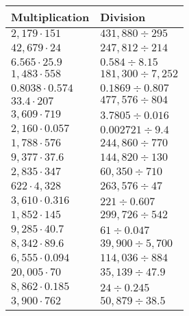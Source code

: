 \begin{longtable}[]{@{}ll@{}}
\toprule
Multiplication & Division\tabularnewline
\midrule
\endhead
\(2,179\cdot151\) & \(431,880÷295\)\tabularnewline
\(42,679\cdot24\) & \(247,812÷214\)\tabularnewline
\(6.565\cdot25.9\) & \(0.584÷8.15\)\tabularnewline
\(1,483\cdot558\) & \(181,300÷7,252\)\tabularnewline
\(0.8038\cdot0.574\) & \(0.1869÷0.807\)\tabularnewline
\(33.4\cdot207\) & \(477,576÷804\)\tabularnewline
\(3,609\cdot719\) & \(3.7805÷0.016\)\tabularnewline
\(2,160\cdot0.057\) & \(0.002721÷9.4\)\tabularnewline
\(1,788\cdot576\) & \(244,860÷770\)\tabularnewline
\(9,377\cdot37.6\) & \(144,820÷130\)\tabularnewline
\(2,835\cdot347\) & \(60,350÷710\)\tabularnewline
\(622\cdot4,328\) & \(263,576÷47\)\tabularnewline
\(3,610\cdot0.316\) & \(221÷0.607\)\tabularnewline
\(1,852\cdot145\) & \(299,726÷542\)\tabularnewline
\(9,285\cdot40.7\) & \(61÷0.047\)\tabularnewline
\(8,342\cdot89.6\) & \(39,900÷5,700\)\tabularnewline
\(6,555\cdot0.094\) & \(114,036÷884\)\tabularnewline
\(20,005\cdot70\) & \(35,139÷47.9\)\tabularnewline
\(8,862\cdot0.185\) & \(24÷0.245\)\tabularnewline
\(3,900\cdot762\) & \(50,879÷38.5\)\tabularnewline
\bottomrule
\end{longtable}
